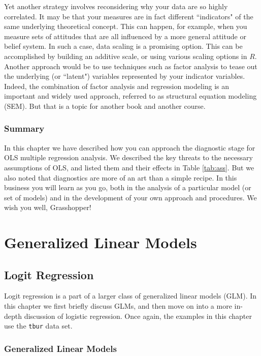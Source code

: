\documentclass[11pt,openany]{book}\usepackage[]{graphicx}\usepackage[]{color}
\begin{document}
{Yet another strategy involves reconsidering why your data are so highly  correlated. It may be that your measures are in fact different ``indicators" of the same underlying theoretical concept. This can happen, for example, when you measure sets of attitudes that are all influenced by a more general attitude or belief system. In such a case, data scaling is a promising option. This can be accomplished by building an additive scale, or using various scaling options in $R$. Another approach would be to use techniques such as factor analysis to tease out the underlying (or ``latent") variables represented by your indicator variables. Indeed, the combination of factor analysis and regression modeling is an important and widely used approach, referred to as structural equation modeling (SEM).  But that is a topic for another book and another course.

\section{Summary}
In this chapter we have described how you can approach the diagnostic stage for OLS multiple regression analysis. We described the key threats to the necessary assumptions of OLS, and listed them and their effects in Table \ref{tab:ass}. But we also noted that diagnostics are more of an art than a simple recipe. In this business you will learn as you go, both in the analysis of a particular model (or set of models) and in the development of  your own approach and procedures. We wish you well, Grasshopper!

\part{Generalized Linear Models}





\chapter{Logit Regression} 


Logit regression is a part of a larger class of generalized linear models (GLM).   In this chapter we first briefly discuss GLMs, and then move on into a more in-depth discussion of logistic regression. Once again, the examples in this chapter use the \texttt{tbur} data set. 

\section{Generalized Linear Models} 

}
\end{document}
